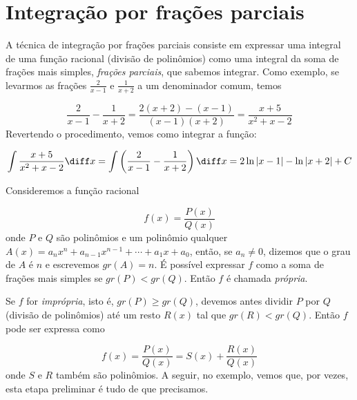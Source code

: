 \documentclass[a4paper, 12pt]{extreport}
\begin{document}
  \chapter{Integração por frações parciais}
    A técnica de integração por frações parciais consiste em expressar uma integral de uma função racional (divisão de polinômios)
    como uma integral da soma de frações mais simples, \textsl{frações parciais}, que sabemos integrar. Como exemplo, se levarmos as frações
    $\frac{2}{x-1}$ e $\frac{1}{x+2}$ a um denominador comum, temos

    $$ \frac{2}{x-1} - \frac{1}{x+2} = \frac{2(x+2)-(x-1)}{(x-1)(x+2)} = \frac{x+5}{x^2+x-2}$$
    Revertendo o procedimento, vemos como integrar a função:

    $$ \int{\frac{x+5}{x^2+x-2}\diff x} = \int{\left(\frac{2}{x-1} - \frac{1}{x+2}\right)\diff x} = 2\ln|x-1| - \ln|x+2| + C $$

    Consideremos a função racional

    \begin{equation}
      f(x) = \frac{P(x)}{Q(x)}
    \end{equation}
    onde $P$ e $Q$ são polinômios e um polinômio qualquer $A(x) = a_nx^n + a_{n-1}x^{n-1} + \cdots + a_1x + a_0$, então, se $a_n \neq 0$, dizemos que o grau de $A$
    é $n$ e escrevemos $gr(A) = n$. É possível expressar $f$ como a soma de frações mais simples se $gr(P) < gr(Q)$. Então $f$ é chamada \textsl{própria}.

    Se $f$ for \textsl{imprópria}, isto é, $gr(P) \geqslant gr(Q)$, devemos antes dividir $P$ por $Q$ (divisão de polinômios) até um resto $R(x)$ tal que $gr(R) < gr(Q)$. Então $f$ pode ser expressa como

    \begin{equation}
      f(x) = \frac{P(x)}{Q(x)} = S(x) + \frac{R(x)}{Q(x)}
    \end{equation}
    onde $S$ e $R$ também são polinômios. A seguir, no exemplo, vemos que, por vezes, esta etapa preliminar é tudo de que precisamos.
\end{document}
